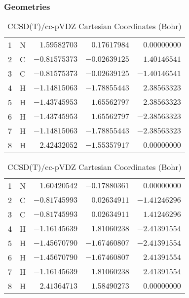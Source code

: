 \documentclass[10pt,oneside]{article}
\begin{document}
\begin{table}[h!]
\subsubsection*{Geometries}
\begin{multicols}{2}
\centering
\caption{CCSD(T)/cc-pVTZ Cartesian Coordinates (Bohr)}
\begin{tabular}{llrrr}
\toprule
1  & N  & $ 1.59582703$ & $ 0.17617984$ & $ 0.00000000$ \\
2  & C  & $-0.81575373$ & $-0.02639125$ & $ 1.40146541$ \\
3  & C  & $-0.81575373$ & $-0.02639125$ & $-1.40146541$ \\
4  & H  & $-1.14815063$ & $-1.78855443$ & $ 2.38563323$ \\
5  & H  & $-1.43745953$ & $ 1.65562797$ & $ 2.38563323$ \\
6  & H  & $-1.43745953$ & $ 1.65562797$ & $-2.38563323$ \\
7  & H  & $-1.14815063$ & $-1.78855443$ & $-2.38563323$ \\
8  & H  & $ 2.42432052$ & $-1.55357917$ & $ 0.00000000$ \\
\bottomrule
\end{tabular}
\caption{CCSD(T)/cc-pVDZ Cartesian Coordinates (Bohr)}
\begin{tabular}{llrrr}
\toprule
1  & N  & $ 1.60420542$ & $-0.17880361$ & $ 0.00000000$ \\
2  & C  & $-0.81745993$ & $ 0.02634911$ & $-1.41246296$ \\
3  & C  & $-0.81745993$ & $ 0.02634911$ & $ 1.41246296$ \\
4  & H  & $-1.16145639$ & $ 1.81060238$ & $-2.41391554$ \\
5  & H  & $-1.45670790$ & $-1.67460807$ & $-2.41391554$ \\
6  & H  & $-1.45670790$ & $-1.67460807$ & $ 2.41391554$ \\
7  & H  & $-1.16145639$ & $ 1.81060238$ & $ 2.41391554$ \\
8  & H  & $ 2.41364713$ & $ 1.58490273$ & $ 0.00000000$ \\
\bottomrule
\end{tabular}
\end{multicols}
\end{table}
\end{document}
